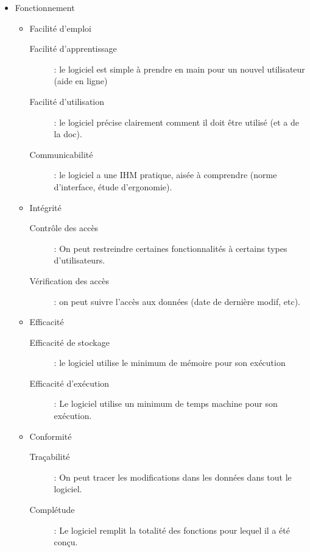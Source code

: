 \begin{itemize}

\item Fonctionnement
	\begin{itemize}

	\item Facilité d'emploi
		\begin{description}	
		\item[Facilité d'apprentissage] : le logiciel est simple à prendre en main pour un nouvel utilisateur (aide en ligne)		
		\item[Facilité d'utilisation] : le logiciel précise clairement comment il doit être utilisé (et a de la doc).
		\item[Communicabilité] : le logiciel a une IHM pratique, aisée à comprendre (norme d'interface, étude d'ergonomie).
		\end{description}

	\item Intégrité
		\begin{description}
		\item[Contrôle des accès] : On peut restreindre certaines fonctionnalités à certains types d'utilisateurs.
		\item[Vérification des accès] : on peut suivre l'accès aux données (date de dernière modif, etc).
		\end{description}

	\item Efficacité
		\begin{description}	
		\item[Efficacité de stockage] : le logiciel utilise le minimum de mémoire pour son exécution			
		\item[Efficacité d'exécution] : Le logiciel utilise un minimum de temps machine pour son exécution.
		\end{description}

	\item Conformité
		\begin{description}	
		\item[Traçabilité] : On peut tracer les modifications dans les données dans tout le logiciel.		
		\item[Complétude] : Le logiciel remplit la totalité des fonctions pour lequel il a été conçu.
		\end{description}


\end{itemize}
\end{itemize}

